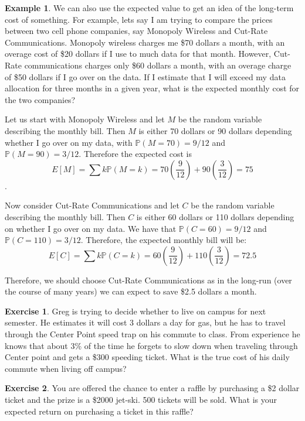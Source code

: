 \documentclass[
]{book}
\newcommand{\prob}[1]{{\mathbb{P}(#1)}}
\theoremstyle{definition}
\theoremstyle{definition}
\newtheorem{example}{Example}[chapter]
\theoremstyle{definition}
\newtheorem{exercise}{Exercise}[chapter]
\theoremstyle{definition}
\theoremstyle{remark}
\begin{document}
\begin{example}
\protect\hypertarget{exm:unnamed-chunk-262}{}\label{exm:unnamed-chunk-262}We can also use the expected value to get an idea of the long-term cost of something. For example, lets say I am trying to compare the prices between two cell phone companies, say Monopoly Wireless and Cut-Rate Communications. Monopoly wireless charges me \$70 dollars a month, with an overage cost of \$20 dollars if I use to much data for that month. However, Cut-Rate communications charges only \$60 dollars a month, with an overage charge of \$50 dollars if I go over on the data. If I estimate that I will exceed my data allocation for three months in a given year, what is the expected monthly cost for the two companies?

Let us start with Monopoly Wireless and let \(M\) be the random variable describing the monthly bill. Then \(M\) is either 70 dollars or 90 dollars depending whether I go over on my data, with \(\prob{M=70}=9/12\) and \(\prob{M=90}=3/12\). Therefore the expected cost is \[E[M]=\sum k \prob{M=k}=70\left(\frac{9}{12}\right)+90\left(\frac{3}{12}\right)=75\].

Now consider Cut-Rate Communications and let \(C\) be the random variable describing the monthly bill. Then \(C\) is either 60 dollars or 110 dollars depending on whether I go over on my data. We have that \(\prob{C=60}=9/12\) and \(\prob{C=110}=3/12\). Therefore, the expected monthly bill will be: \[ E[C]=\sum k \prob{C=k}=60\left( \frac{9}{12} \right)+110\left( \frac{3}{12} \right)=72.5\]

Therefore, we should choose Cut-Rate Communications as in the long-run (over the course of many years) we can expect to save \$2.5 dollars a month.
\end{example}

\begin{exercise}
\protect\hypertarget{exr:unnamed-chunk-263}{}\label{exr:unnamed-chunk-263}Greg is trying to decide whether to live on campus for next semester. He estimates it will cost 3 dollars a day for gas, but he has to travel through the Center Point speed trap on his commute to class. From experience he knows that about 3\% of the time he forgets to slow down when traveling through Center point and gets a \$300 speeding ticket. What is the true cost of his daily commute when living off campus?
\end{exercise}

\begin{exercise}
\protect\hypertarget{exr:unnamed-chunk-264}{}\label{exr:unnamed-chunk-264}You are offered the chance to enter a raffle by purchasing a \$2 dollar ticket and the prize is a \$2000 jet-ski. 500 tickets will be sold. What is your expected return on purchasing a ticket in this raffle?
\end{exercise}
\end{document}
